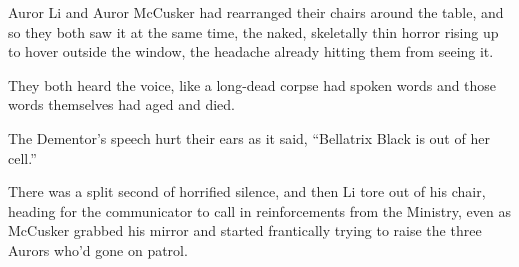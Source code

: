 Auror Li and Auror McCusker had rearranged their chairs around the table, and so they both saw it at the same time, the naked, skeletally thin horror rising up to hover outside the window, the headache already hitting them from seeing it.

They both heard the voice, like a long-dead corpse had spoken words and those words themselves had aged and died.

The Dementor's speech hurt their ears as it said, ``Bellatrix Black is out of her cell.''

There was a split second of horrified silence, and then Li tore out of his chair, heading for the communicator to call in reinforcements from the Ministry, even as McCusker grabbed his mirror and started frantically trying to raise the three Aurors who'd gone on patrol.
